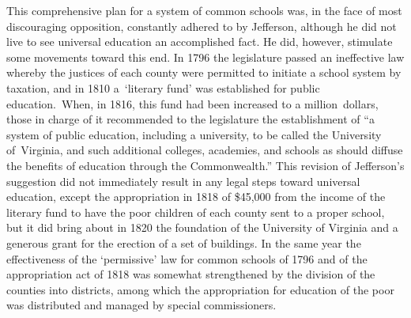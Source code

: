 \documentclass[]{book}
\begin{document}
This comprehensive plan for a system of common schools was, in the face of most discouraging opposition, constantly adhered to by Jefferson, although he did not live to see universal education an accomplished fact. He did, however, stimulate some movements toward this end. In 1796 the legislature passed an ineffective law whereby the justices of each county were permitted to initiate a school system by taxation, and in 1810 a~`literary fund' was established for public education.~When, in 1816, this fund had been increased to a million~dollars, those in charge of it recommended to the legislature the establishment of ``a system of public education, including a university, to be called the University of~Virginia, and such additional colleges, academies, and schools as should diffuse the benefits of education through the Commonwealth.'' This revision of Jefferson's suggestion did not immediately result in any legal steps toward universal education, except the appropriation in 1818 of \$45,000 from the income of the literary fund to have the poor children of each county sent to a proper school, but it did bring about in 1820 the foundation of the University of Virginia and a generous grant for the erection of a set of buildings. In the same year the effectiveness of the `permissive' law for common schools of 1796 and of the appropriation act of 1818 was somewhat strengthened by the division of the counties into districts, among which the appropriation for education of the poor was distributed and managed by special commissioners.
\end{document}
